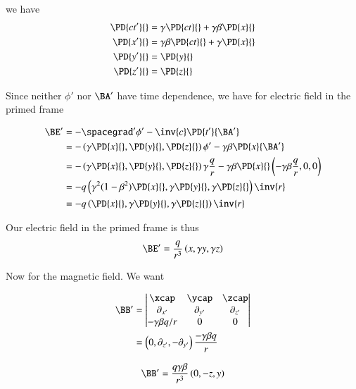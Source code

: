 we have
\begin{align}\label{eqn:relElectroDynProblemSet2:1050}
\PD{c t'}{} &= \gamma \PD{ct}{} + \gamma \beta \PD{x}{} \\
\PD{x'}{} &= \gamma \beta \PD{ct}{} + \gamma \PD{x}{} \\
\PD{y'}{} &= \PD{y}{} \\
\PD{z'}{} &= \PD{z}{}
\end{align}

Since neither $\phi'$ nor $\BA'$ have time dependence, we have for electric field in the primed frame

\begin{align*}
\BE' 
&= -\spacegrad' \phi' - \inv{c} \PD{t'}{\BA'} \\
&= 
-\left( \gamma \PD{x}{}, \PD{y}{}, \PD{z}{} \right) \phi'
- \gamma \beta \PD{x}{\BA'} \\
&= 
-\left( \gamma \PD{x}{}, \PD{y}{}, \PD{z}{} \right) \gamma \frac{q}{r}
- \gamma \beta \PD{x}{} \left( -\gamma \beta \frac{q}{r}, 0, 0 \right) \\
&= -q \left( \gamma^2 ( 1 - \beta^2 ) \PD{x}{}, \gamma \PD{y}{}, \gamma \PD{z}{} \right) \inv{r} \\
&= -q \left( \PD{x}{}, \gamma \PD{y}{}, \gamma \PD{z}{} \right) \inv{r}
\end{align*}

Our electric field in the primed frame is thus
\begin{equation}\label{eqn:relElectroDynProblemSet2:1070}
\BE' = \frac{q}{r^3} \left( x, \gamma y, \gamma z \right) 
\end{equation}

Now for the magnetic field.  We want

\begin{align*}
\BB' 
&= 
\begin{vmatrix}
\xcap & \ycap & \zcap \\
\partial_{x'} & \partial_{y'} & \partial_{z'} \\
-\gamma \beta q/r & 0 & 0
\end{vmatrix} \\
&=
\left( 0, \partial_{z'}, -\partial_{y'} \right) \frac{-\gamma \beta q}{r} \\
\end{align*}

\begin{equation}\label{eqn:relElectroDynProblemSet2:1090}
\BB'
=
\frac{q \gamma \beta}{r^3} \left( 0, -z, y \right)
\end{equation}

